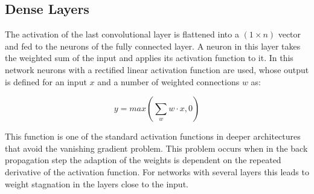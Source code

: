 \documentclass[main.tex]{subfiles}
\begin{document}
\subsection{Dense Layers}
The activation of the last convolutional layer is flattened into a $(1 \times n)$ vector and fed to the neurons of the fully connected layer. A neuron in this layer takes the weighted sum of the input and applies its activation function to it. In this network neurons with a rectified linear activation function are used, whose output is defined for an input $x$ and a number of weighted connections $w$ as:

\begin{equation}
\label{eq:dense}
y=max\left(\sum_w w \cdot x,0\right)
\end{equation}

This function is one of the standard activation functions in deeper architectures that avoid the vanishing gradient problem. This problem occurs when in the back propagation step the adaption of the weights is dependent on the repeated derivative of the activation function. For networks with several layers this leads to weight stagnation in the layers close to the input.
\end{document}
